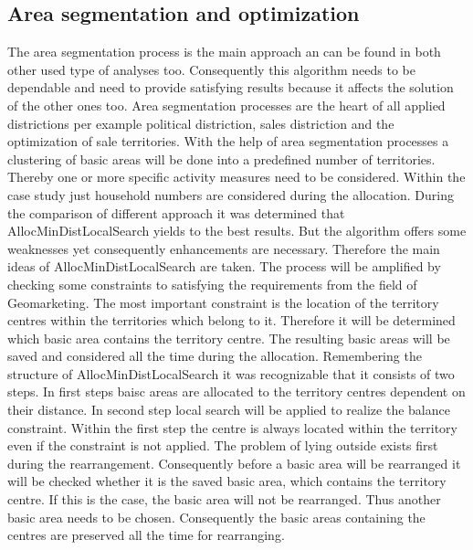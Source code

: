 \subsection{Area segmentation and optimization}\label{areaseg}
The area segmentation process is the main approach an can be found in both other used type of analyses too. Consequently this algorithm needs to be dependable and need to provide satisfying results because it affects the solution of the other ones too. Area segmentation processes are the heart of all applied districtions per example political distriction, sales distriction and the optimization of sale territories. With the help of area segmentation processes a clustering of basic areas will be done into a predefined number of territories. Thereby one or more specific activity measures need to be considered. Within the case study just household numbers are considered during the allocation. During the comparison of different approach it was determined that AllocMinDistLocalSearch yields to the best results. But the algorithm offers some weaknesses yet consequently enhancements are necessary. Therefore the main ideas of AllocMinDistLocalSearch are taken. The process will be amplified by checking some constraints to satisfying the requirements from the field of Geomarketing. The most important constraint is the location of the territory centres within the territories which belong to it. Therefore it will be determined which basic area contains the territory centre. The resulting basic areas will be saved and considered all the time during the allocation. Remembering the structure of AllocMinDistLocalSearch it was recognizable that it consists of two steps. In first steps baisc areas are allocated to the territory centres dependent on their distance. In second step local search will be applied to realize the balance constraint. Within the first step the centre is always located within the territory even if the constraint is not applied. The problem of lying outside exists first during the rearrangement. Consequently before a basic area will be rearranged it will be checked whether it is the saved basic area, which contains the territory centre. If this is the case, the basic area will not be rearranged. Thus another basic area needs to be chosen. Consequently the basic areas containing the centres are preserved all the time for rearranging. \\
